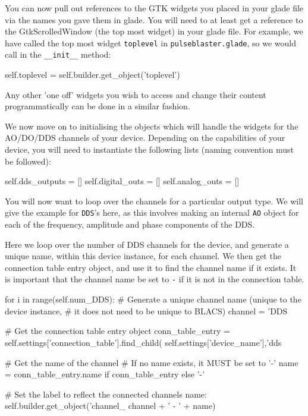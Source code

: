 \documentclass[12pt]{article}
\begin{document}
You can now pull out references to the GTK widgets you placed in your glade file via the names you gave them in glade. You will need to at least get a reference to the GtkScrolledWindow (the top most widget) in your glade file. For example, we have called the top most widget \texttt{toplevel} in \texttt{pulseblaster.glade}, so we would call in the \texttt{\_\_init\_\_} method:
\begin{python} 
        self.toplevel = self.builder.get_object('toplevel')
\end{python}
Any other 'one off' widgets you wish to access and change their content programmatically can be done in a similar fashion.

We now move on to initialising the objects which will handle the widgets for the AO/DO/DDS channels of your device. Depending on the capabilities of your device, you will need to instantiate the following lists (naming convention must be followed):
\begin{python}
        self.dds_outputs = []
        self.digital_outs = []
        self.analog_outs = []
\end{python}

You will now want to loop over the channels for a particular output type. We will give the example for \texttt{DDS}'s here, as this involves making an internal \texttt{AO} object for each of the frequency, amplitude and phase components of the DDS.

Here we loop over the number of DDS channels for the device, and generate a unique name, within this device instance, for each channel. We then get the connection table entry object, and use it to find the channel name if it exists. It is important that the channel name be set to \texttt{-} if it is not in the connection table.
\begin{python}
        for i in range(self.num_DDS):
            # Generate a unique channel name (unique to the device instance,
            # it does not need to be unique to BLACS)
            channel = 'DDS %
            
            # Get the connection table entry object
            conn_table_entry = self.settings['connection_table'].find_child(
                self.settings['device_name'],'dds %
                
            # Get the name of the channel
            # If no name exists, it MUST be set to '-'
            name = conn_table_entry.name if conn_table_entry else '-'
            
            # Set the label to reflect the connected channels name:
            self.builder.get_object('channel_%
                channel + ' - ' + name)
\end{python}  
\end{document}
